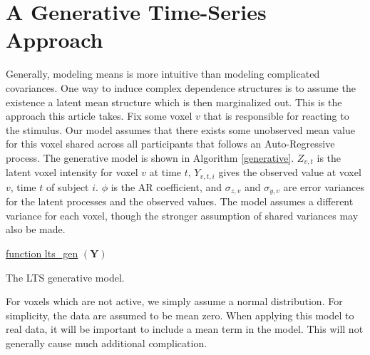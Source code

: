 \documentclass[a4paper]{article}
\begin{document}
\section{A Generative Time-Series Approach }

Generally, modeling means is more intuitive than modeling complicated covariances. One way to induce complex dependence structures is to assume the existence a latent mean structure which is then marginalized out. This is the approach this article takes. Fix some voxel $v$ that is responsible for reacting to the stimulus. Our model assumes that there exists some unobserved mean value for this voxel shared across all participants that follows an Auto-Regressive process. The generative model is shown in Algorithm \ref{generative}. $Z_{v,t}$ is the latent voxel intensity for voxel $v$ at time $t$, $Y_{v,t,i}$ gives the observed value at voxel $v$, time $t$ of subject $i$. $\phi$ is the AR coefficient, and $\sigma_{z,v}$ and $\sigma_{y,v}$ are error variances for the latent processes and the observed values. The model assumes a different variance for each voxel, though the stronger assumption of shared variances may also be made.

\begin{algorithm}
    \label{generative}

    \underline{function lts\_gen} $(\mathbf{Y})$\;

    \caption{The LTS generative model.}
\end{algorithm}

For voxels which are not active, we simply assume a normal distribution. For simplicity, the data are assumed to be mean zero. When applying this model to real data, it will be important to include a mean term in the model. This will not generally cause much additional complication.
\end{document}
